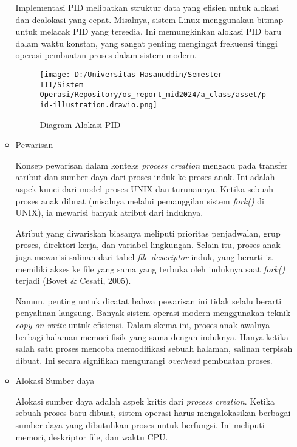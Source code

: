 \documentclass[12pt]{article}
\begin{document}
\begin{itemize}
\begin{itemize}
        Implementasi PID melibatkan struktur data yang efisien 
        untuk alokasi dan dealokasi yang cepat. Misalnya, sistem 
        Linux menggunakan bitmap untuk melacak PID yang tersedia. 
        Ini memungkinkan alokasi PID baru dalam waktu konstan, 
        yang sangat penting mengingat frekuensi tinggi operasi 
        pembuatan proses dalam sistem modern.

        \begin{figure}[h]
            \centering
            \texttt{[image: D:/Universitas Hasanuddin/Semester III/Sistem Operasi/Repository/os\_report\_mid2024/a\_class/asset/pid-illustration.drawio.png]}
            \caption{Diagram Alokasi PID}
        \end{figure}

        \item Pewarisan
        
        Konsep pewarisan dalam konteks \textit{process creation} 
        mengacu pada transfer atribut dan sumber daya dari proses 
        induk ke proses anak. Ini adalah aspek kunci dari model 
        proses UNIX dan turunannya. Ketika sebuah proses anak 
        dibuat (misalnya melalui pemanggilan sistem 
        \textit{fork()} di UNIX), ia mewarisi banyak atribut dari 
        induknya.

        Atribut yang diwariskan biasanya meliputi prioritas 
        penjadwalan, grup proses, direktori kerja, dan variabel 
        lingkungan. Selain itu, proses anak juga mewarisi salinan 
        dari tabel \textit{file descriptor} induk, yang berarti 
        ia memiliki akses ke file yang sama yang terbuka oleh 
        induknya saat \textit{fork()} terjadi (Bovet \& Cesati, 
        2005).

        Namun, penting untuk dicatat bahwa pewarisan ini tidak 
        selalu berarti penyalinan langsung. Banyak sistem operasi 
        modern menggunakan teknik \textit{copy-on-write} untuk 
        efisiensi. Dalam skema ini, proses anak awalnya berbagi 
        halaman memori fisik yang sama dengan induknya. Hanya 
        ketika salah satu proses mencoba memodifikasi sebuah 
        halaman, salinan terpisah dibuat. Ini secara signifikan 
        mengurangi \textit{overhead} pembuatan proses.

        \item Alokasi Sumber daya
        
        Alokasi sumber daya adalah aspek kritis dari 
        \textit{process creation}. Ketika sebuah proses baru 
        dibuat, sistem operasi harus mengalokasikan berbagai 
        sumber daya yang dibutuhkan proses untuk berfungsi. Ini 
        meliputi memori, deskriptor file, dan waktu CPU.


\end{itemize}
\end{itemize}
\end{document}
